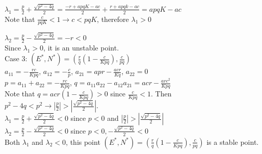 \documentclass[11pt,letterpaper]{article}
\begin{document}
$\lambda_1 = \frac{p}{2} + \frac{\sqrt{p^2 - 4q}}{2}  = \frac{-r + apqK - ac}{2} + \frac{r + apqk - ac}{2} = apqK - ac$  \\

Note that $\frac{c}{pqK} < 1 \rightarrow c < pqK$, therefore $\lambda_1 > 0$

$\lambda_2 = \frac{p	}{2} - \frac{\sqrt{p^2 - 4q}}{2} = -r < 0$ \\

\noindent Since $\lambda_1 > 0$, it is an unstable point. \\

\noindent Case 3: $(E^*, N^*) = (\frac{r}{q} (1 - \frac{c}{Kpq}), \frac{c}{pq})$ \\

$a_{11} = - \frac{rc}{Kpq} $, $a_{12} = - \frac{c}{p}$, $a_{21} = apr - \frac{acr}{Kq}$, $a_{22} = 0$ \\

$p = a_{11} + a_{22} = - \frac{rc}{Kpq}$, $q = a_{11}a_{22} - a_{12} a_{21} = acr  - \frac{arc^2}{Kpq}$ \\

Note that $q = acr(1 - \frac{c}{Kpq}) > 0$ since $\frac{c}{Kpq} < 1$. Then $p^2 - 4q < p^2 \rightarrow |\frac{p}{2}| > |\frac{\sqrt{p^2 - 4q}}{2}|$. \\

$\lambda_1 = \frac{p}{2} + \frac{\sqrt{p^2 - 4q}}{2} < 0$ since $p < 0$ and $|\frac{p}{2}| > |\frac{\sqrt{p^2 - 4q}}{2}|$ \\

$\lambda_2 = \frac{p}{2} - \frac{\sqrt{p^2 - 4q}}{2} < 0$ since $p < 0,  - \frac{\sqrt{p^2 - 4q}}{2} < 0$ \\

Both $\lambda_1$ and $\lambda_2 < 0$, this point $(E^*, N^*) = (\frac{r}{q} (1 - \frac{c}{Kpq}), \frac{c}{pq})$ is a stable point. 
\end{document}
